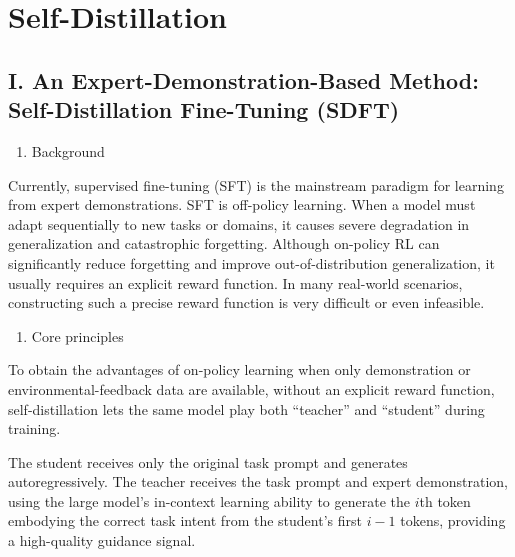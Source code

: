 \setcounter{section}{4}

\hypertarget{self-distillation}{%
\section{Self-Distillation}\label{self-distillation}}

\hypertarget{i.-an-expert-demonstration-based-method-self-distillation-fine-tuning-sdft}{%
\subsection{I. An Expert-Demonstration-Based Method: Self-Distillation Fine-Tuning (SDFT)}\label{i.-an-expert-demonstration-based-method-self-distillation-fine-tuning-sdft}}

\begin{enumerate}
\def\labelenumi{\arabic{enumi}.}
\tightlist
\item
  Background
\end{enumerate}

Currently, supervised fine-tuning (SFT) is the mainstream paradigm for learning from expert demonstrations. SFT is off-policy learning. When a model must adapt sequentially to new tasks or domains, it causes severe degradation in generalization and catastrophic forgetting. Although on-policy RL can significantly reduce forgetting and improve out-of-distribution generalization, it usually requires an explicit reward function. In many real-world scenarios, constructing such a precise reward function is very difficult or even infeasible.

\begin{enumerate}
\def\labelenumi{\arabic{enumi}.}
\setcounter{enumi}{1}
\tightlist
\item
  Core principles
\end{enumerate}

To obtain the advantages of on-policy learning when only demonstration or environmental-feedback data are available, without an explicit reward function, self-distillation lets the same model play both ``teacher'' and ``student'' during training.

The student receives only the original task prompt and generates autoregressively. The teacher receives the task prompt and expert demonstration, using the large model's in-context learning ability to generate the \(i\)th token embodying the correct task intent from the student's first \(i-1\) tokens, providing a high-quality guidance signal.

